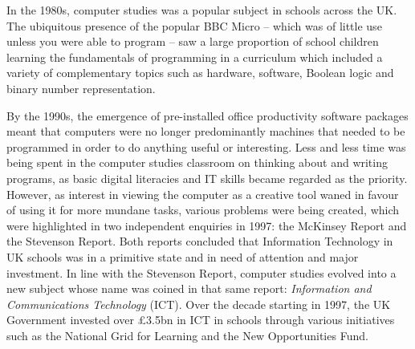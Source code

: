 \documentclass[conference]{IEEEtran}
\begin{document}
In the 1980s, computer studies was a popular subject in schools across
the UK.
The ubiquitous presence %
of the popular BBC Micro -- which was of little use
unless you were able to program -- saw a large proportion
of school children learning the fundamentals of programming in a
curriculum which included a variety of complementary topics such as
hardware, software, Boolean logic and binary number
representation.


By the 1990s, the emergence of pre-installed
office productivity software packages
meant that computers were no
longer predominantly machines that needed to be programmed in order to
do anything useful or interesting.  Less and less time was being spent
in the computer studies classroom on thinking about and writing
programs, as basic digital literacies and IT skills became regarded as
the priority. However, as interest in viewing the computer as a
creative tool waned in favour of using it for more mundane tasks,
various problems were being created, which were highlighted in two
independent enquiries in 1997: the McKinsey
Report %
and the Stevenson Report. %
Both reports concluded that Information
Technology in UK schools was in a primitive state and in need of
attention and major investment. In line with the Stevenson Report,
computer studies evolved into a new subject whose name was coined in
that same report: {\emph{Information and Communications Technology}}
(ICT).  Over the decade starting in 1997, the UK Government invested
over \pounds3.5bn in ICT in schools through various initiatives
such as the National Grid for Learning and the New
Opportunities Fund. %
\end{document}
